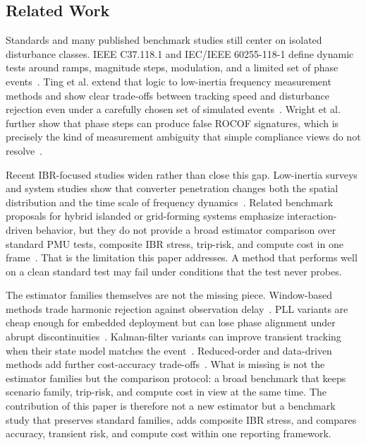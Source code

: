 ﻿\subsection{Related Work}
\label{sec:related}

Standards and many published benchmark studies still center on isolated
disturbance classes. IEEE C37.118.1 and IEC/IEEE 60255-118-1 define dynamic
tests around ramps, magnitude steps, modulation, and a limited set of phase
events~\cite{IEEE_C37_118,IEC_IEEE_60255_118_1_2018}. Ting et al. extend that
logic to low-inertia frequency measurement methods and show clear trade-offs
between tracking speed and disturbance rejection even under a carefully chosen
set of simulated events~\cite{Ting2022}. Wright et al. further show that phase
steps can produce false ROCOF signatures, which is precisely the kind of
measurement ambiguity that simple compliance views do not resolve~\cite{Wright2019}.

Recent IBR-focused studies widen rather than close this gap.
Low-inertia surveys and system studies show that converter penetration changes
both the spatial distribution and the time scale of frequency dynamics~\cite{Milano2018LowInertia,
Pinheiro2025,Ponce2025}. Related benchmark proposals for hybrid islanded or
grid-forming systems emphasize interaction-driven behavior, but they do not
provide a broad estimator comparison over standard PMU tests, composite IBR
stress, trip-risk, and compute cost in one frame~\cite{Bernal2025,Zoghby2024}.
That is the limitation this paper addresses. A method that performs well on a
clean standard test may fail under conditions that the test never probes.

The estimator families themselves are not the missing piece. Window-based
methods trade harmonic rejection against observation delay~\cite{Belega2014,
PlatasGarza2011}. PLL variants are cheap enough for embedded deployment but can
lose phase alignment under abrupt discontinuities~\cite{Golestan2017,Wright2019}.
Kalman-filter variants can improve transient tracking when their state model
matches the event~\cite{Ferrero2020EKF,Chamorro2021}. Reduced-order and
data-driven methods add further cost-accuracy trade-offs~\cite{Netto2018KoopmanKF}.
What is missing is not the estimator families but the comparison protocol: a broad benchmark
that keeps
scenario family, trip-risk, and compute cost in view at the same time. The
contribution of this paper is therefore not a new estimator but a benchmark
study that preserves standard families, adds composite IBR stress, and compares
accuracy, transient risk, and compute cost within one reporting framework.
